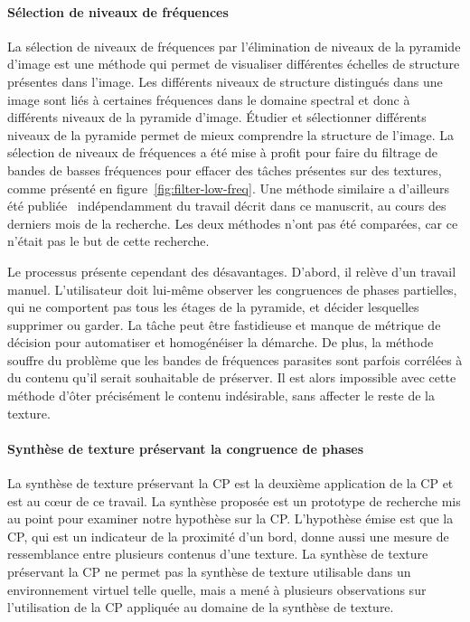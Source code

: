 \paragraph{Sélection de niveaux de fréquences}

La sélection de niveaux de fréquences par l'élimination de niveaux de la pyramide d'image est une méthode qui permet de visualiser différentes échelles de structure présentes dans l'image. Les différents niveaux de structure distingués dans une image sont liés à certaines fréquences dans le domaine spectral et donc à différents niveaux de la pyramide d'image. Étudier et sélectionner différents niveaux de la pyramide permet de mieux comprendre la structure de l'image. La sélection de niveaux de fréquences a été mise à profit pour faire du filtrage de bandes de basses fréquences pour effacer des tâches présentes sur des textures, comme présenté en figure~\ref{fig:filter-low-freq}. Une méthode similaire a d'ailleurs été publiée~\cite{zhang_pyramid_2023} indépendamment du travail décrit dans ce manuscrit, au cours des derniers mois de la recherche. Les deux méthodes n'ont pas été comparées, car ce n'était pas le but de cette recherche.

\bigskip

Le processus présente cependant des désavantages. D'abord, il relève d'un travail manuel. L'utilisateur doit lui-même observer les congruences de phases partielles, qui ne comportent pas tous les étages de la pyramide, et décider lesquelles supprimer ou garder. La tâche peut être fastidieuse et manque de métrique de décision pour automatiser et homogénéiser la démarche. De plus, la méthode souffre du problème que les bandes de fréquences parasites sont parfois corrélées à du contenu qu'il serait souhaitable de préserver. Il est alors impossible avec cette méthode d'ôter précisément le contenu indésirable, sans affecter le reste de la texture.

\paragraph{Synthèse de texture préservant la congruence de phases}
\label{par:discussion-synthesis}

La synthèse de texture préservant la CP est la deuxième application de la CP et est au cœur de ce travail. La synthèse proposée est un prototype de recherche mis au point pour examiner notre hypothèse sur la CP. L'hypothèse émise est que la CP, qui est un indicateur de la proximité d'un bord, donne aussi une mesure de ressemblance entre plusieurs contenus d'une texture. La synthèse de texture préservant la CP ne permet pas la synthèse de texture utilisable dans un environnement virtuel telle quelle, mais a mené à plusieurs observations sur l'utilisation de la CP appliquée au domaine de la synthèse de texture.


